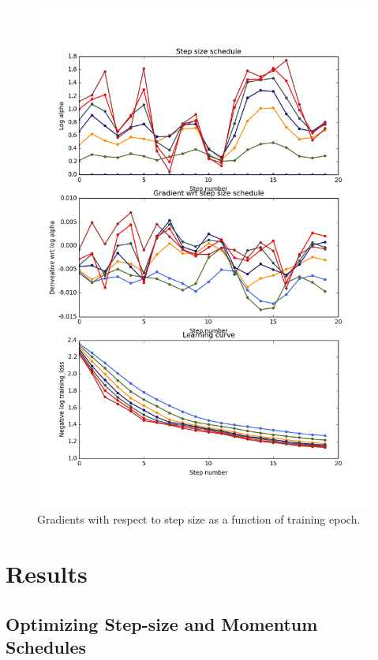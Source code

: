\documentclass{article}
\begin{document}
\begin{figure}[ht]
\vskip 0.2in
\begin{center}
\centerline{\includegraphics[width=\columnwidth]{../experiments/Jan_15_optimize_learning_rate_schedule/2/fig.png}}
\caption{Gradients with respect to step size as a function of training epoch.}
\label{fig:chaos}
\end{center}
\vskip -0.2in
\end{figure} 


\section{Results}

\subsection{Optimizing Step-size and Momentum Schedules}
\end{document}
